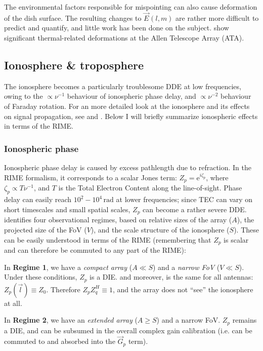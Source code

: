 \documentclass[]{aa}
\newcommand{\herm}{H}
\newcommand{\jones}[2]{\vec {#1}_{#2}}
\begin{document}
The environmental factors responsible for mispointing can also cause deformation of the dish surface. The resulting changes to $\jones{E}{}(l,m)$ are rather more difficult to predict and quantify, and little work has been done on the subject. \citet{Harp:ATA-beams} show significant thermal-related deformations at the Allen Telescope Array (ATA).

\subsection{Ionosphere \& troposphere}

The ionosphere becomes a particularly troublesome DDE at low frequencies, owing to the $\propto\nu^{-1}$ behaviour of ionospheric phase delay, and $\propto\nu^{-2}$ behaviour of Faraday rotation. For an more detailed look at the ionosphere and its effects on signal propagation, see \citet[Sect.~13.3]{tms} and \citet{Intema:SPAM}. Below I will briefly summarize ionospheric effects in terms of the RIME.

\subsubsection{Ionospheric phase}

Ionospheric phase delay is caused by excess pathlength due to refraction. In the RIME formalism, it corresponds to a scalar Jones term: $Z_p=\mathrm{e}^{i\zeta_p}$, where $\zeta_p\propto T \nu^{-1}$, and $T$ is the Total Electron Content along the line-of-sight. Phase delay can easily reach $10^2-10^4\,\mathrm{rad}$ at lower frequencies; since TEC can vary on short timescales and small spatial scales, $Z_p$ can become a rather severe DDE. \citet{Lonsdale:4regimes} identifies four observational regimes, based on relative sizes of the array ($A$), the projected size of the FoV ($V$), and the scale structure of the ionosphere ($S$). These can be easily understood in terms of the RIME (remembering that $Z_p$ is scalar and can therefore be commuted to any part of the RIME):

In {\bf Regime 1}, we have a \emph{compact array} ($A \ll S$) and a \emph{narrow FoV} ($V\ll S$). Under these conditions, $Z_p$ is a DIE. and moreover, is the same for all antennas: $Z_p(\vec l) \equiv Z_0$. Therefore $Z_p Z_q^\herm \equiv 1$, and the array does not ``see'' the ionosphere at all.

In {\bf Regime 2}, we have an \emph{extended array} ($A \ge S$) and a narrow FoV. $Z_p$ remains a DIE, and can be subsumed in the overall complex gain calibration (i.e. can be commuted to and absorbed into the $\jones{G}{p}$ term).
\end{document}

